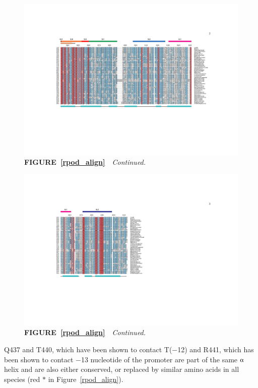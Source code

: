 \begin{figure}
\centering
\includegraphics{figures/chap4_rpod_align_2}
{\footnotesize\bfseries\sffamily
FIGURE~\ref{rpod_align}}~{\footnotesize\sffamily\itshape\
Continued.}
\end{figure}
\begin{figure}
\centering
\includegraphics{figures/chap4_rpod_align_3}
{\footnotesize\bfseries\sffamily
FIGURE~\ref{rpod_align}}~{\footnotesize\sffamily\itshape\
Continued.}
\end{figure}

Q437 and T440, which have been shown to contact T($-$12) and R441,
which has been shown to contact $-$13 nucleotide of the promoter
are part of the same $\alphaup$ helix and are also either
conserved, or replaced by similar amino acids in all species (red
$\ast$ in Figure~\ref{rpod_align}).

